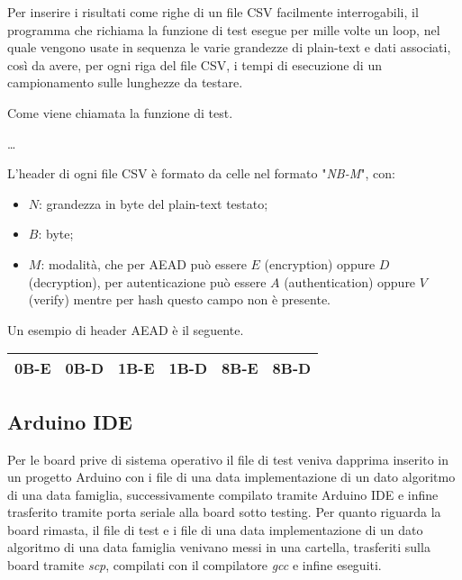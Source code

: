 \documentclass[12pt,a4paper,italian]{report}
\begin{document}
\noindent Per inserire i risultati come righe di un file CSV facilmente interrogabili, il programma che richiama la funzione di test esegue per mille volte un loop, nel quale vengono usate in sequenza le varie grandezze di plain-text e dati associati, così da avere, per ogni riga del file CSV, i tempi di esecuzione di un campionamento sulle lunghezze da testare.

\begin{algorithm}
    \caption{Come viene chiamata la funzione di test.}
    \begin{algorithmic}[1]
            \State {}
            \State \dots
            \State {}
        \EndFor
    \end{algorithmic}
\end{algorithm}

\noindent L'header di ogni file CSV è formato da celle nel formato "\textit{NB-M}", con:
\begin{itemize}
    \item $N$: grandezza in byte del plain-text testato;
    \item $B$: byte;
    \item $M$: modalità, che per AEAD può essere $E$ (encryption) oppure $D$ (decryption), per autenticazione può essere $A$ (authentication) oppure $V$ (verify) mentre per hash questo campo non è presente.
\end{itemize}

\noindent Un esempio di header AEAD è il seguente.

\begin{table}[H]
    \centering
	\begin{tabular}{|c|c|c|c|c|c|}
		\hline
		0B-E & 0B-D & 1B-E & 1B-D & 8B-E & 8B-D \\
		\hline
    \end{tabular}
\end{table}

\subsection{Arduino IDE}

Per le board prive di sistema operativo il file di test veniva dapprima inserito in un progetto Arduino con i file di una data implementazione di un dato algoritmo di una data famiglia, successivamente compilato tramite Arduino IDE e infine trasferito tramite porta seriale alla board sotto testing. Per quanto riguarda la board rimasta, il file di test e i file di una data implementazione di un dato algoritmo di una data famiglia venivano messi in una cartella, trasferiti sulla board tramite \textit{scp}, compilati con il compilatore \textit{gcc} e infine eseguiti.
\end{document}
